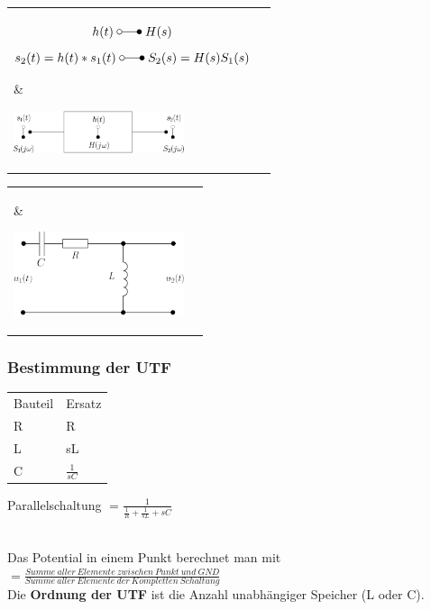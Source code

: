 		\begin{tabular}{ll}
			\parbox{13cm}{
				$$h(t) \; \laplace \; H(s)$$
				$$s_2(t) = h(t) * s_1(t) \; \laplace \; S_2(s) = H(s) S_1(s)$$}
		& 	\parbox{5cm}{
				\includegraphics[width=5cm]{./bilder/utf-theorie.png}}
		\\
		\\
		\end{tabular}
		
		\begin{tabular}{ll}
			\parbox{13cm}{ }
		& 	\parbox{5cm}{
				\includegraphics[width=5cm]{./bilder/utf-beispiel.png}}
		\\	
		\end{tabular}
		
		\subsubsection{Bestimmung der UTF}
		\parbox{10cm}{
			\begin{tabular}{ll}
				Bauteil & Ersatz \\
				R & R\\
				L & sL\\
				C & $\frac{1}{sC}$ \\
			\end{tabular}
			Parallelschaltung $= \frac{1}{\frac{1}{R}+\frac{1}{sL}+sC}$\\ \\}
		\parbox{8cm}{
			
			Das Potential in einem Punkt berechnet man mit $=\frac{Summe\ aller\
			Elemente\ zwischen\ Punkt\ und\ GND}{Summe\ aller\ Elemente\ der\ Kompletten\ Schaltung}$\\
			Die \textbf{Ordnung der UTF} ist die Anzahl unabhängiger Speicher (L oder C).}		
		
